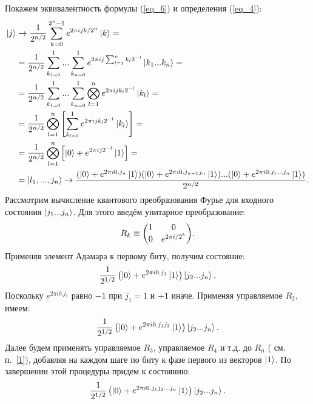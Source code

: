\documentclass[12pt,a4paper]{article}
\begin{document}
	Покажем эквивалентность формулы (\ref{eq_6}) и определения (\ref{eq_4}):\\
	\begin{equation}\label{eq_7}	
		\begin{split} 
			\ket{j}&\rightarrow\frac{1}{2^{n/2}}\sum_{k=0}^{2^{n}-1}e^{2\pi ijk/{2^{n}}}\ket{k}=\\
			&=\frac{1}{2^{n/2}}\sum_{k_{1=0}}^{1}...\sum_{k_{n=0}}^{1}e^{2\pi ij\sum_{l=1}^{n}k_{l}{2^{-l}}}\ket{k_{1}...k_{n}}=\\
			&=\frac{1}{2^{n/2}}\sum_{k_{1=0}}^{1}...\sum_{k_{n=0}}^{1}\bigotimes_{l=1}^{n}e^{2\pi ijk_{l}{2^{-l}}}\ket{k_{l}}=\\
			&=\frac{1}{2^{n/2}}\bigotimes_{l=1}^{n}\left[\sum_{k_{l=0}}^{1}e^{2\pi ijk_{l}{2^{-l}}}\ket{k_{l}}\right]=\\
			&=\frac{1}{2^{n/2}}\bigotimes_{l=1}^{n}\left[\ket{0}+e^{2\pi ij2^{-l}}\ket{1}\right]=\\
			&=\ket{l_{1},...,j_{n}}\rightarrow\frac{(\ket{0}+e^{2\pi i0.j_{n}}\ket{1})(\ket{0}+e^{2\pi i0.j_{n-1}j_{n}}\ket{1})...(\ket{0}+e^{2\pi i0.j_{1}...j_{n}}\ket{1})}{2^{n/2}}.
		\end{split}
	\end{equation}
	Рассмотрим вычисление квантового преобразования Фурье для входного состояния $\ket{j_{1}...j_{n}}$. Для этого введём унитарное преобразование:\\
	\begin{equation}
		R_{k}\equiv\mqty(1&0 \\ 0&e^{2\pi i/2^{k}}).
	\end{equation}
	Применяя элемент Адамара к первому биту, получим состояние:\\
	\begin{equation}
		\frac{1}{2^{1/2}}\left(\ket{0}+e^{2\pi i0.j_{1}}\ket{1}\right)\ket{j_{2}...j_{n}}.	
	\end{equation}
	Поскольку $e^{2\pi i0.j_{1}}$ равно $-1$ при $j_{1}=1$ и $+1$ иначе. Применяя управляемое $R_{2}$, имеем:\\
	\begin{equation}
		\frac{1}{2^{1/2}}\left(\ket{0}+e^{2\pi i0.j_{1}j_{2}}\ket{1}\right)\ket{j_{2}...j_{n}}.
	\end{equation}
	Далее будем применять управляемое $R_{3}$, управляемое $R_{4}$ и т.д. до  $R_{n}$ ( см. п.~\ref{1}), добавляя на каждом шаге по биту к фазе первого из векторов $\ket{1}$. По завершении этой процедуры придем к состоянию:\\
	\begin{equation}
		\frac{1}{2^{1/2}}\left(\ket{0}+e^{2\pi i0.j_{1}j_{2}...j_{n}}\ket{1}\right)\ket{j_{2}...j_{n}}.
	\end{equation}
\end{document}

